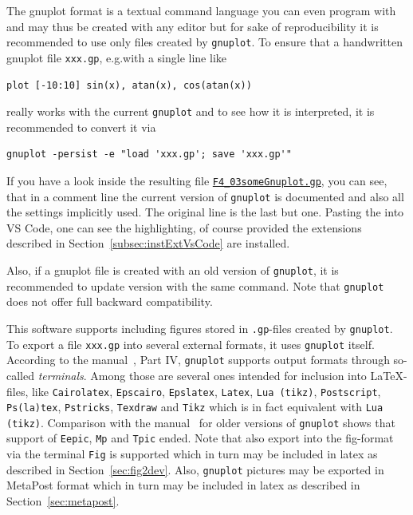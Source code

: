 The gnuplot format is a textual command language you can even program with 
and may thus be created with any editor but
for sake of reproducibility it is recommended to use only files
created by \texttt{gnuplot}.
To ensure that a handwritten gnuplot file \texttt{xxx.gp},
e.g.\@ with a single line like
%
\begin{verbatim}
plot [-10:10] sin(x), atan(x), cos(atan(x))
\end{verbatim}
%
really works
with the current \texttt{gnuplot} and to see how it is interpreted,
it is recommended to convert it via
%
\begin{lstlisting}
gnuplot -persist -e "load 'xxx.gp'; save 'xxx.gp'"
\end{lstlisting}
%
If you have a look inside the resulting file 
\href{\urlSite fromTex/F4_03someGnuplot.gp}{\texttt{F4\_03someGnuplot.gp}}, 
you can see, that in a comment line
the current version of \texttt{gnuplot} is documented
and also all the settings implicitly used.
The original line is the last but one. 
Pasting the into VS Code, one can see the highlighting, 
of course provided the extensions 
described in Section~\ref{subsec:instExtVsCode} are installed. 

Also, if a gnuplot file is created with an old version of \texttt{gnuplot},
it is recommended to update version with the same command.
Note that \texttt{gnuplot} does not offer full backward compatibility. 


This software supports including 
figures stored in \texttt{.gp}-files created by \texttt{gnuplot}.
To export a file \texttt{xxx.gp} into several external formats, 
it uses \texttt{gnuplot} itself. 
According to the manual~\cite{GnuPlot6_0}, Part IV, 
\texttt{gnuplot} supports output formats through so-called \emph{terminals}. 
Among those are several ones intended for inclusion into \LaTeX-files, 
like \texttt{Cairolatex}, \texttt{Epscairo}, \texttt{Epslatex}, 
\texttt{Latex}, \texttt{Lua (tikz)}, \texttt{Postscript}, \texttt{Ps(la)tex}, %
\texttt{Pstricks}, \texttt{Texdraw} and \texttt{Tikz} 
which is in fact equivalent with \texttt{Lua (tikz)}. 
Comparison with the manual~\cite{GnuPlot5_0} for older versions of \texttt{gnuplot} 
shows that support of \texttt{Eepic}, \texttt{Mp} and \texttt{Tpic} ended. 
Note that also export into the fig-format via the terminal \texttt{Fig} 
is supported which in turn may be included in latex 
as described in Section~\ref{sec:fig2dev}. 
Also, \texttt{gnuplot} pictures may be exported in MetaPost format 
which in turn may be included in latex 
as described in Section~\ref{sec:metapost}. 


